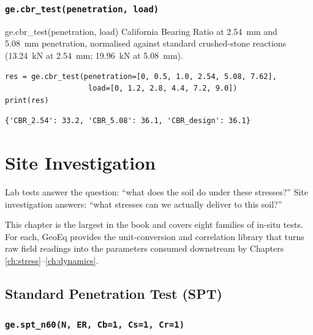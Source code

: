 \documentclass[11pt,a4paper,openany]{book}
\begin{document}
\subsection{\texttt{ge.cbr\_test(penetration, load)}}

\begin{funcbox}{ge.cbr\_test(penetration, load)}
California Bearing Ratio at 2.54~mm and 5.08~mm penetration,
normalised against standard crushed-stone reactions
(13.24~kN at 2.54~mm; 19.96~kN at 5.08~mm).
\end{funcbox}

\begin{lstlisting}
res = ge.cbr_test(penetration=[0, 0.5, 1.0, 2.54, 5.08, 7.62],
                   load=[0, 1.2, 2.8, 4.4, 7.2, 9.0])
print(res)
\end{lstlisting}
\begin{lstlisting}[style=output]
{'CBR_2.54': 33.2, 'CBR_5.08': 36.1, 'CBR_design': 36.1}
\end{lstlisting}

\chapter{Site Investigation}\label{ch:site}

\epigraph{Lab tests answer the question:
``what does the soil do under these stresses?''
Site investigation answers:
``what stresses can we actually deliver to this soil?''}{}

\noindent
This chapter is the largest in the book and covers eight families
of in-situ tests. For each, GeoEq provides the unit-conversion
and correlation library that turns raw field readings into the
parameters consumed downstream by Chapters
\ref{ch:stress}--\ref{ch:dynamics}.

\section{Standard Penetration Test (SPT)}\label{sec:spt}

\subsection{\texttt{ge.spt\_n60(N, ER, Cb=1, Cs=1, Cr=1)}}
\end{document}
